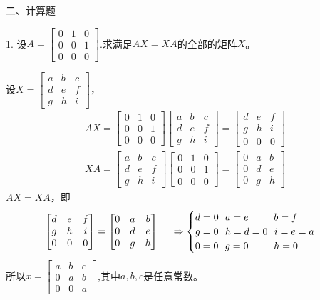 \documentclass{article}
\begin{document}
二、计算题

1. 设$
A=
\begin{bmatrix}
  0 & 1 & 0 \\
  0 & 0 & 1\\
  0 & 0 & 0
\end{bmatrix}
$.求满足$AX=XA$的全部的矩阵$X$。

\begin{jie}
设$X=
\begin{bmatrix}
  a &b& c \\
  d & e &f\\
  g&h&i
\end{bmatrix}
$，
\begin{gather*}
AX=\begin{bmatrix}
  0 & 1 & 0 \\
  0 & 0 & 1\\
  0 & 0 & 0
\end{bmatrix}\begin{bmatrix}
  a &b& c \\
  d & e &f\\
  g&h&i
\end{bmatrix}=
\begin{bmatrix}
d & e & f\\
g & h & i\\
0& 0 & 0
\end{bmatrix}\\
XA=
\begin{bmatrix}
  a &b& c \\
  d & e &f\\
  g&h&i
\end{bmatrix}\begin{bmatrix}
  0 & 1 & 0 \\
  0 & 0 & 1\\
  0 & 0 & 0
\end{bmatrix}=
\begin{bmatrix}
  0 & a & b\\
  0 & d & e\\
  0 & g & h
\end{bmatrix}
\end{gather*}
$AX=XA$，即
\begin{align*}
\begin{bmatrix}
d & e & f\\
g & h & i\\
0& 0 & 0
\end{bmatrix}=\begin{bmatrix}
  0 & a & b\\
  0 & d & e\\
  0 & g & h
\end{bmatrix}~~~~\Rightarrow
\begin{cases}
d=0~~a=e\hphantom{=0}~~~b=f\\
g=0~~h=d=0~~i=e=a\\
0=0~~g=0\hphantom{=0}~~~h=0
\end{cases}
\end{align*}
所以$x=
\begin{bmatrix}
  a & b & c \\
  0& a & b\\
  0 & 0 & a
\end{bmatrix}
$,其中$a,b,c$是任意常数。
\end{jie}
\end{document}
